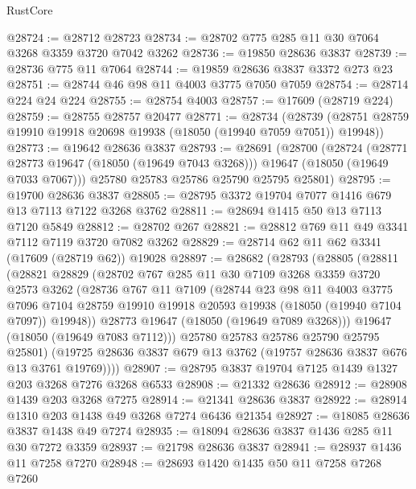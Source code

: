 \begin{lexlean}{RustCore}
\begin{coremodule}
@28724 := @28712 @28723
@28734 := @28702 @775 @285 @11 @30 @7064 @3268 @3359 @3720 @7042 @3262
@28736 := @19850 @28636 @3837
@28739 := @28736 @775 @11 @7064
@28744 := @19859 @28636 @3837 @3372 @273 @23
@28751 := @28744 @46 @98 @11 @4003 @3775 @7050 @7059
@28754 := @28714 @224 @24 @224
@28755 := @28754 @4003
@28757 := @17609 (@28719 @224)
@28759 := @28755 @28757 @20477
@28771 := @28734
    (@28739 (@28751 @28759 @19910 @19918 @20698 @19938 (@18050 (@19940 @7059 @7051)) @19948))
@28773 := @19642 @28636 @3837
@28793 := @28691
    (@28700
      (@28724
        (@28771 @28773 @19647 (@18050 (@19649 @7043 @3268)))
        @19647
        (@18050 (@19649 @7033 @7067)))
      @25780
      @25783
      @25786
      @25790
      @25795
      @25801)
@28795 := @19700 @28636 @3837
@28805 := @28795 @3372 @19704 @7077 @1416 @679 @13 @7113 @7122 @3268 @3762
@28811 := @28694 @1415 @50 @13 @7113 @7120 @5849
@28812 := @28702 @267
@28821 := @28812 @769 @11 @49 @3341 @7112 @7119 @3720 @7082 @3262
@28829 := @28714 @62 @11 @62 @3341 (@17609 (@28719 @62)) @19028
@28897 := @28682
    (@28793
      (@28805
        (@28811
          (@28821
            @28829
            (@28702
              @767
              @285
              @11
              @30
              @7109
              @3268
              @3359
              @3720
              @2573
              @3262
              (@28736
                @767
                @11
                @7109
                (@28744
                  @23
                  @98
                  @11
                  @4003
                  @3775
                  @7096
                  @7104
                  @28759
                  @19910
                  @19918
                  @20593
                  @19938
                  (@18050 (@19940 @7104 @7097))
                  @19948))
              @28773
              @19647
              (@18050 (@19649 @7089 @3268)))
            @19647
            (@18050 (@19649 @7083 @7112)))
          @25780
          @25783
          @25786
          @25790
          @25795
          @25801)
        (@19725 @28636 @3837 @679 @13 @3762 (@19757 @28636 @3837 @676 @13 @3761 @19769))))
@28907 := @28795 @3837 @19704 @7125 @1439 @1327 @203 @3268 @7276 @3268 @6533
@28908 := @21332 @28636
@28912 := @28908 @1439 @203 @3268 @7275
@28914 := @21341 @28636 @3837
@28922 := @28914 @1310 @203 @1438 @49 @3268 @7274 @6436 @21354
@28927 := @18085 @28636 @3837 @1438 @49 @7274
@28935 := @18094 @28636 @3837 @1436 @285 @11 @30 @7272 @3359
@28937 := @21798 @28636 @3837
@28941 := @28937 @1436 @11 @7258 @7270
@28948 := @28693 @1420 @1435 @50 @11 @7258 @7268 @7260

\end{coremodule}
\end{lexlean}
